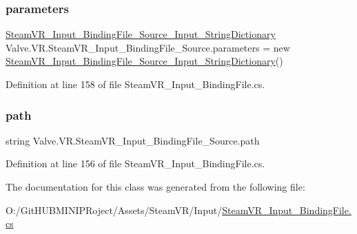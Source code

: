 \subsubsection{\texorpdfstring{parameters}{parameters}}
{\footnotesize\ttfamily \mbox{\hyperlink{class_valve_1_1_v_r_1_1_steam_v_r___input___binding_file___source___input___string_dictionary}{Steam\+V\+R\+\_\+\+Input\+\_\+\+Binding\+File\+\_\+\+Source\+\_\+\+Input\+\_\+\+String\+Dictionary}} Valve.\+V\+R.\+Steam\+V\+R\+\_\+\+Input\+\_\+\+Binding\+File\+\_\+\+Source.\+parameters = new \mbox{\hyperlink{class_valve_1_1_v_r_1_1_steam_v_r___input___binding_file___source___input___string_dictionary}{Steam\+V\+R\+\_\+\+Input\+\_\+\+Binding\+File\+\_\+\+Source\+\_\+\+Input\+\_\+\+String\+Dictionary}}()}



Definition at line 158 of file Steam\+V\+R\+\_\+\+Input\+\_\+\+Binding\+File.\+cs.

\mbox{\label{class_valve_1_1_v_r_1_1_steam_v_r___input___binding_file___source_a0e59cbdd1285b38947c656efcf55b640}} 
\subsubsection{\texorpdfstring{path}{path}}
{\footnotesize\ttfamily string Valve.\+V\+R.\+Steam\+V\+R\+\_\+\+Input\+\_\+\+Binding\+File\+\_\+\+Source.\+path}



Definition at line 156 of file Steam\+V\+R\+\_\+\+Input\+\_\+\+Binding\+File.\+cs.



The documentation for this class was generated from the following file\+:\begin{DoxyCompactItemize}
\item 
O\+:/\+Git\+H\+U\+B\+M\+I\+N\+I\+P\+Roject/\+Assets/\+Steam\+V\+R/\+Input/\mbox{\hyperlink{_steam_v_r___input___binding_file_8cs}{Steam\+V\+R\+\_\+\+Input\+\_\+\+Binding\+File.\+cs}}\end{DoxyCompactItemize}
